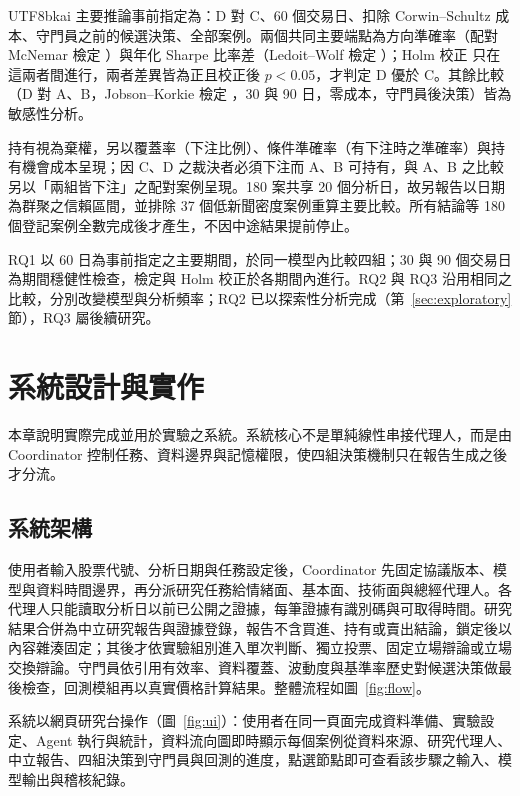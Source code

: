 \documentclass[12pt,a4paper]{article}
\newcommand{\grp}[1]{\textsf{#1}}
\begin{document}
\begin{CJK}{UTF8}{bkai}
主要推論事前指定為：\grp{D} 對 \grp{C}、60 個交易日、扣除 Corwin--Schultz 成本、守門員之前的候選決策、全部案例。兩個共同主要端點為方向準確率（配對 McNemar 檢定 \citep{mcnemar1947}）與年化 Sharpe 比率差（Ledoit--Wolf 檢定 \citep{ledoit2008sharpe}）；Holm 校正 \citep{holm1979} 只在這兩者間進行，兩者差異皆為正且校正後 $p<0.05$，才判定 \grp{D} 優於 \grp{C}。其餘比較（\grp{D} 對 \grp{A}、\grp{B}，Jobson--Korkie 檢定 \citep{jobson1981sharpe}，30 與 90 日，零成本，守門員後決策）皆為敏感性分析。

持有視為棄權，另以覆蓋率（下注比例）、條件準確率（有下注時之準確率）與持有機會成本呈現；因 \grp{C}、\grp{D} 之裁決者必須下注而 \grp{A}、\grp{B} 可持有，與 \grp{A}、\grp{B} 之比較另以「兩組皆下注」之配對案例呈現。180 案共享 20 個分析日，故另報告以日期為群聚之信賴區間，並排除 37 個低新聞密度案例重算主要比較。所有結論等 180 個登記案例全數完成後才產生，不因中途結果提前停止。

RQ1 以 60 日為事前指定之主要期間，於同一模型內比較四組；30 與 90 個交易日為期間穩健性檢查，檢定與 Holm 校正於各期間內進行。RQ2 與 RQ3 沿用相同之比較，分別改變模型與分析頻率；RQ2 已以探索性分析完成（第~\ref{sec:exploratory} 節），RQ3 屬後續研究。

\section{系統設計與實作}
\label{sec:system}

本章說明實際完成並用於實驗之系統。系統核心不是單純線性串接代理人，而是由 Coordinator 控制任務、資料邊界與記憶權限，使四組決策機制只在報告生成之後才分流。

\subsection{系統架構}

使用者輸入股票代號、分析日期與任務設定後，Coordinator 先固定協議版本、模型與資料時間邊界，再分派研究任務給情緒面、基本面、技術面與總經代理人。各代理人只能讀取分析日以前已公開之證據，每筆證據有識別碼與可取得時間。研究結果合併為中立研究報告與證據登錄，報告不含買進、持有或賣出結論，鎖定後以內容雜湊固定；其後才依實驗組別進入單次判斷、獨立投票、固定立場辯論或立場交換辯論。守門員依引用有效率、資料覆蓋、波動度與基準率歷史對候選決策做最後檢查，回測模組再以真實價格計算結果。整體流程如圖~\ref{fig:flow}。

系統以網頁研究台操作（圖~\ref{fig:ui}）：使用者在同一頁面完成資料準備、實驗設定、Agent 執行與統計，資料流向圖即時顯示每個案例從資料來源、研究代理人、中立報告、四組決策到守門員與回測的進度，點選節點即可查看該步驟之輸入、模型輸出與稽核紀錄。


\end{CJK}
\end{document}
